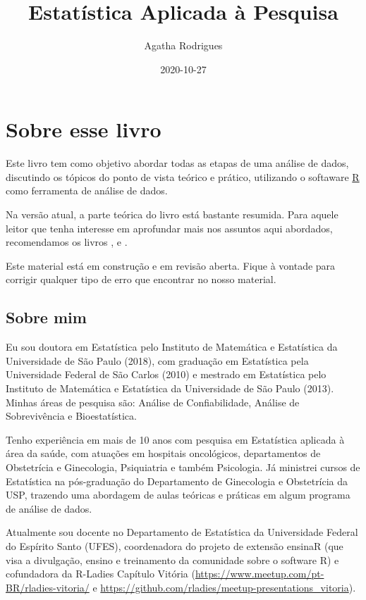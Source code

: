 \documentclass[
]{book}
\title{Estatística Aplicada à Pesquisa}
\author{Agatha Rodrigues}
\date{2020-10-27}
\begin{document}
\maketitle

{
\setcounter{tocdepth}{1}
\tableofcontents
}
\hypertarget{sobre-esse-livro}{%
\chapter{Sobre esse livro}\label{sobre-esse-livro}}

Este livro tem como objetivo abordar todas as etapas de uma análise de dados, discutindo os tópicos do ponto de vista teórico e prático, utilizando o softaware \href{https://cran.r-project.org/}{R} como ferramenta de análise de dados.

Na versão atual, a parte teórica do livro está bastante resumida. Para aquele leitor que tenha interesse em aprofundar mais nos assuntos aqui abordados, recomendamos os livros \citep{morettin2020introduccaoa}, \citep{bussab2004estatistica} e \citep{magalhaes2002noccoes}.

Este material está em construção e em revisão aberta. Fique à vontade para corrigir qualquer tipo de erro que encontrar no nosso material.

\hypertarget{sobre-mim}{%
\section{Sobre mim}\label{sobre-mim}}

Eu sou doutora em Estatística pelo Instituto de Matemática e Estatística da Universidade de São Paulo (2018), com graduação em Estatística pela Universidade Federal de São Carlos (2010) e mestrado em Estatística pelo Instituto de Matemática e Estatística da Universidade de São Paulo (2013). Minhas áreas de pesquisa são: Análise de Confiabilidade, Análise de Sobrevivência e Bioestatística.

Tenho experiência em mais de 10 anos com pesquisa em Estatística aplicada à área da saúde, com atuações em hospitais oncológicos, departamentos de Obstetrícia e Ginecologia, Psiquiatria e também Psicologia. Já ministrei cursos de Estatística na pós-graduação do Departamento de Ginecologia e Obstetrícia da USP, trazendo uma abordagem de aulas teóricas e práticas em algum programa de análise de dados.

Atualmente sou docente no Departamento de Estatística da Universidade Federal do Espírito Santo (UFES), coordenadora do projeto de extensão ensinaR (que visa a divulgação, ensino e treinamento da comunidade sobre o software R) e cofundadora da R-Ladies Capítulo Vitória (\url{https://www.meetup.com/pt-BR/rladies-vitoria/} e \url{https://github.com/rladies/meetup-presentations_vitoria}).
\end{document}
